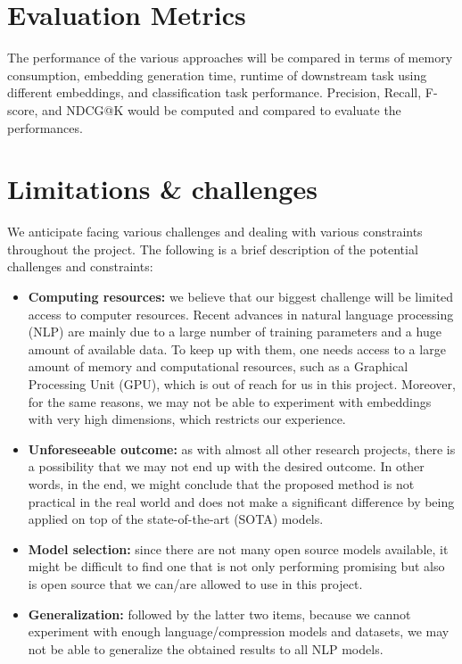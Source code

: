 \documentclass{article}
\begin{document}
\section{Evaluation Metrics}
The performance of the various approaches will be compared in terms of memory consumption, embedding generation time, runtime of downstream task using different embeddings, and classification task performance. Precision, Recall, F-score, and NDCG@K would be computed and compared to evaluate the performances.    

\section{Limitations \& challenges}
We anticipate facing various challenges and dealing with various constraints throughout the project. The following is a brief description of the potential challenges and constraints:
\begin{itemize}

    \item \textbf{Computing resources:} we believe that our biggest challenge will be limited access to computer resources. Recent advances in natural language processing (NLP) are mainly due to a large number of training parameters and a huge amount of available data. To keep up with them, one needs access to a large amount of memory and computational resources, such as a Graphical Processing Unit (GPU), which is out of reach for us in this project. Moreover, for the same reasons, we may not be able to experiment with embeddings with very high dimensions, which restricts our experience.
    
    \item \textbf{Unforeseeable outcome:} as with almost all other research projects, there is a possibility that we may not end up with the desired outcome. In other words, in the end, we might conclude that the proposed method is not practical in the real world and does not make a significant difference by being applied on top of the state-of-the-art (SOTA) models.
    
    \item \textbf{Model selection:} since there are not many open source models available, it might be difficult to find one that is not only performing promising but also is open source that we can/are allowed to use in this project.
    
    \item \textbf{Generalization:} followed by the latter two items, because we cannot experiment with enough language/compression models and datasets, we may not be able to generalize the obtained results to all NLP models.
\end{itemize}
\end{document}
